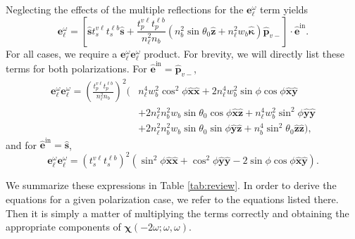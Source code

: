 Neglecting the effects of the multiple reflections for the
$\mathbf{e}^{\omega}_{\ell}$ term yields
\begin{equation*}\label{eq:ewell}
\mathbf{e}^{\omega}_{\ell} = 
\left[
\hat{\mathbf{s}}t_{s}^{v\ell}t_{s}^{\ell b}\hat{\mathbf{s}} 
+ \frac{t^{v\ell}_{p}t^{\ell b}_{p}}{n^{2}_{\ell}n_{b}}
\left(
  n^{2}_{b}\sin\theta_{0}\hat{\mathbf{z}} 
+ n^{2}_{\ell}w_{b}\hat{\boldsymbol{\kappa}}
\right)
\hat{\mathbf{p}}_{v-}
\right]
\cdot\hat{\mathbf{e}}^{\mathrm{in}}.
\end{equation*}
For all cases, we require a
$\mathbf{e}^{\omega}_{\ell}\mathbf{e}^{\omega}_{\ell}$ product. For brevity, we
will directly list these terms for both polarizations. For
$\hat{\mathbf{e}}^{\mathrm{in}} = \hat{\mathbf{p}}_{v-}$,
\begin{equation}\label{eq:ewewp}
\begin{split}
\mathbf{e}^{\omega}_{\ell}\mathbf{e}^{\omega}_{\ell}
= \left(\frac{t^{v\ell}_{p}t^{\ell b}_{p}}
{n^{2}_{\ell}n_{b}}\right)^{2}
\big(
  &n^{4}_{\ell}w^{2}_{b}\cos^{2}\phi
\hat{\mathbf{x}}\hat{\mathbf{x}}
+ 2n^{4}_{\ell}w^{2}_{b}\sin\phi\cos\phi
\hat{\mathbf{x}}\hat{\mathbf{y}}\\
&+ 2n^{2}_{\ell}n^{2}_{b}w_{b}\sin\theta_{0}\cos\phi
\hat{\mathbf{x}}\hat{\mathbf{z}}
+ n^{4}_{\ell}w^{2}_{b}\sin^{2}\phi
\hat{\mathbf{y}}\hat{\mathbf{y}}\\
&+ 2n^{2}_{\ell}n^{2}_{b}w_{b}\sin\theta_{0}\sin\phi
\hat{\mathbf{y}}\hat{\mathbf{z}}
+ n^{4}_{b}\sin^{2}\theta_{0}
\hat{\mathbf{z}}\hat{\mathbf{z}}
\big),
\end{split}
\end{equation}
and for $\hat{\mathbf{e}}^{\mathrm{in}} = \hat{\mathbf{s}}$,
\begin{equation}\label{eq:ewews}
\mathbf{e}^{\omega}_{\ell}\mathbf{e}^{\omega}_{\ell}
= \left(t^{v\ell}_{s}t^{\ell b}_{s}\right)^{2}
\left(
  \sin^{2}\phi\hat{\mathbf{x}}\hat{\mathbf{x}}
+ \cos^{2}\phi\hat{\mathbf{y}}\hat{\mathbf{y}} 
- 2\sin\phi\cos\phi\hat{\mathbf{x}}\hat{\mathbf{y}}
\right).
\end{equation}

We summarize these expressions in Table \ref{tab:review}. In order to derive the
equations for a given polarization case, we refer to the equations listed there.
Then it is simply a matter of multiplying the terms correctly and obtaining the
appropriate components of $\boldsymbol{\chi}(-2\omega; \omega, \omega)$.

